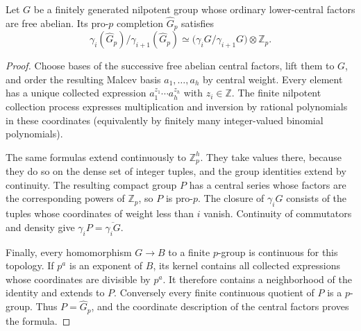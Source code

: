 \begin{lemma}
\label{lem:lm-nilpotent-completion}
Let $G$ be a finitely generated nilpotent group whose ordinary
lower-central factors are free abelian.  Its pro-$p$ completion
$\widehat G_p$ satisfies
\[
 \gamma_i(\widehat G_p)/\gamma_{i+1}(\widehat G_p)
 \simeq\bigl(\gamma_iG/\gamma_{i+1}G\bigr)\otimes\mathbb Z_p.
\]
\end{lemma}
\begin{proof}
Choose bases of the successive free abelian central factors,
lift them to $G$, and order the resulting Malcev basis
$a_1,\ldots,a_h$ by central weight.  Every element has a
unique collected expression $a_1^{z_1}\cdots a_h^{z_h}$
with $z_i\in\mathbb Z$.  The finite nilpotent collection
process expresses multiplication and inversion by rational
polynomials in these coordinates (equivalently by finitely
many integer-valued binomial polynomials).

The same formulas extend continuously to $\mathbb Z_p^h$.
They take values there, because they do so on the dense set
of integer tuples, and the group identities extend by
continuity.  The resulting compact group $P$ has a central
series whose factors are the corresponding powers of
$\mathbb Z_p$, so $P$ is pro-$p$.  The closure of
$\gamma_iG$ consists of the tuples whose coordinates of
weight less than $i$ vanish.  Continuity of commutators and
density give $\gamma_iP=\overline{\gamma_iG}$.

Finally, every homomorphism $G\to B$ to a finite $p$-group
is continuous for this topology.  If $p^a$ is an exponent
of $B$, its kernel contains all collected expressions
whose coordinates are divisible by $p^a$.  It therefore
contains a neighborhood of the identity and extends to $P$.
Conversely every finite continuous quotient of $P$ is a
$p$-group.  Thus $P=\widehat G_p$, and the coordinate
description of the central factors proves the formula.
\end{proof}

